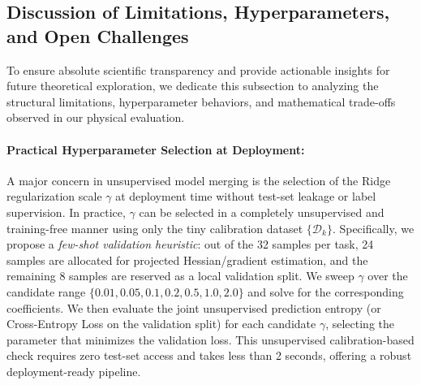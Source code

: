 \subsection{Discussion of Limitations, Hyperparameters, and Open Challenges}
To ensure absolute scientific transparency and provide actionable insights for future theoretical exploration, we dedicate this subsection to analyzing the structural limitations, hyperparameter behaviors, and mathematical trade-offs observed in our physical evaluation.

\paragraph{Practical Hyperparameter Selection at Deployment:}
A major concern in unsupervised model merging is the selection of the Ridge regularization scale $\gamma$ at deployment time without test-set leakage or label supervision. In practice, $\gamma$ can be selected in a completely unsupervised and training-free manner using only the tiny calibration dataset $\{\mathcal{D}_k\}$. Specifically, we propose a \emph{few-shot validation heuristic}: out of the 32 samples per task, 24 samples are allocated for projected Hessian/gradient estimation, and the remaining 8 samples are reserved as a local validation split. We sweep $\gamma$ over the candidate range $\{0.01, 0.05, 0.1, 0.2, 0.5, 1.0, 2.0\}$ and solve for the corresponding coefficients. We then evaluate the joint unsupervised prediction entropy (or Cross-Entropy Loss on the validation split) for each candidate $\gamma$, selecting the parameter that minimizes the validation loss. This unsupervised calibration-based check requires zero test-set access and takes less than 2 seconds, offering a robust deployment-ready pipeline.

